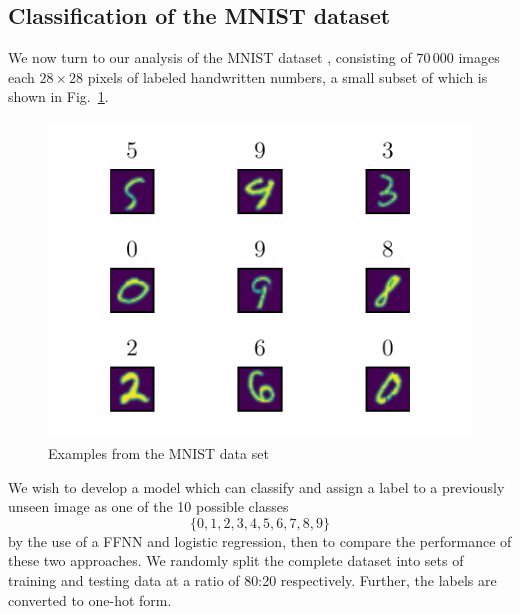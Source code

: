 \documentclass[reprint, english, nofootinbib]{revtex4-2}
\begin{document}

\subsection{Classification of the MNIST dataset}
\noindent
We now turn to our analysis of the MNIST dataset \cite{lecun2010mnist}, consisting of $70\,000$ images each $28\times28$ pixels of labeled handwritten numbers, a small subset of which is shown in Fig.~\ref{fig: MNIST example}.
\begin{figure}[h!tb]
    \center
    \includegraphics[width=.75\columnwidth]{MNIST_example.pdf}
    \caption{\label{fig: MNIST example}Examples from the MNIST data set}
\end{figure}
We wish to develop a model which can classify and assign a label to a previously unseen image as one of the 10 possible classes
\begin{equation*}
    \{0, 1, 2, 3, 4, 5, 6, 7, 8, 9\}
\end{equation*}
by the use of a FFNN and logistic regression, then to compare the performance of these two approaches. We randomly split the complete dataset into sets of training and testing data at a ratio of 80:20 respectively. Further, the labels are converted to one-hot form.
\end{document}
